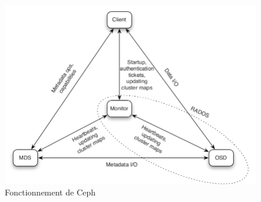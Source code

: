 \documentclass[12pt]{report}
\begin{document}
		        \begin{figure}[H]
			        \begin{center}
				        \includegraphics[width=0.61\linewidth]{images/Ceph_architecture2.png}
				        \caption{Fonctionnement de Ceph}
			        \end{center}
		        \end{figure}
\end{document}
